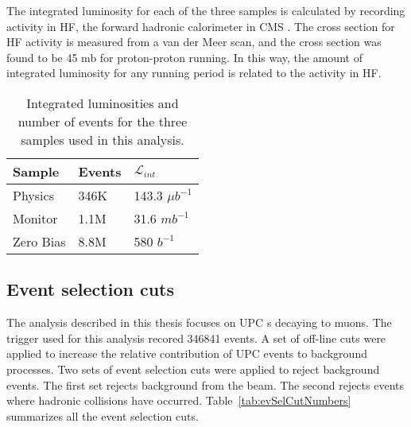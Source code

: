       The integrated luminosity for each of the three samples is calculated
        by recording activity in HF, the forward hadronic calorimeter in CMS
        \cite{cmsLumi}. 
      The cross section for HF activity is measured from a van der Meer scan, 
        and the cross section was found to be 45 mb for proton-proton running.
      In this way, the amount of integrated luminosity for any running period is
        related to the activity in HF. 
      \begin{table}
  	    \centering
  	    \begin{tabular}{|l|l|l|}
  	      \hline Sample & Events & $\mathcal{L}_{int}$ \\ \hline \hline
          Physics & 346K & 143.3 $\mu$$b^{-1}$ \\ \hline
          Monitor & 1.1M & 31.6 $mb^{-1}$ \\ \hline
          Zero Bias & 8.8M & 580 $b^{-1}$ \\ \hline 
  	    \end{tabular}
  	    \caption{Integrated luminosities and number of events for the three
  	      samples used in this analysis.}
  	    \label{tab:sampleLumiNevt}
      \end{table}
  
    \subsection{Event selection cuts}
      The analysis described in this thesis focuses on UPC \JPsi{}s decaying to 
        muons. 
      The trigger used for this analysis recored 346841 events.
      A set of off-line cuts were applied to increase the relative contribution 
        of UPC events to background processes. 
      Two sets of event selection cuts were applied to reject background events. 
      The first set rejects background from the beam.
      The second rejects events where hadronic collisions have occurred.
      Table~\ref{tab:evSelCutNumbers} summarizes all the event selection cuts. 
 
